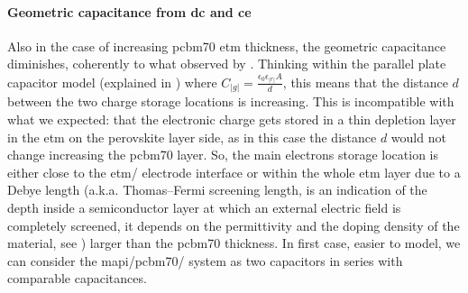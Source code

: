 \paragraph{Geometric capacitance from \gls{dc} and \gls{ce}}
Also in the case of increasing \gls{pcbm70} \gls{etm} thickness, the geometric capacitance diminishes, coherently to what observed by .
Thinking within the parallel plate capacitor model (explained in ) where $C_|g| = \frac{\epsilon_0 \epsilon_|r| A}{d}$, this means that the distance $d$ between the two charge storage locations is increasing.
This is incompatible with what we expected: that the electronic charge gets stored in a thin depletion layer in the \gls{etm} on the perovskite layer side, as in this case the distance $d$ would not change increasing the \gls{pcbm70} layer.
So, the main electrons storage location is either close to the \gls{etm}\-/ electrode interface or within the whole \gls{etm} layer due to a Debye length (a.k.a. Thomas–Fermi screening length, is an indication of the depth inside a semiconductor layer at which an external electric field is completely screened, it depends on the permittivity and the doping density of the material, see ) larger than the \gls{pcbm70} thickness.
In first case, easier to model, we can consider the \gls{mapi}\-/\gls{pcbm70}\-/ system as two capacitors in series with comparable capacitances.


